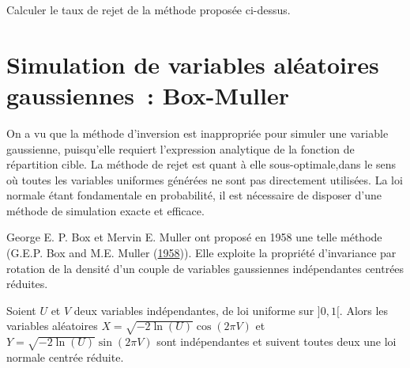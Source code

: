 \label{V-tauxrej}
Calculer le taux de rejet de la méthode proposée
ci-dessus.

\section{Simulation de variables aléatoires gaussiennes~:
Box-Muller}\label{V-simulation-de-variables-aluxe9atoires-gaussiennes-box-muller}

On a vu que la méthode d'inversion est inappropriée pour simuler une
variable gaussienne, puisqu'elle requiert l'expression analytique de la
fonction de répartition cible. La méthode de rejet est quant à elle sous-optimale,dans le sens où toutes les variables uniformes générées ne sont pas directement utilisées.
La loi normale étant fondamentale en probabilité, il est nécessaire de disposer d'une méthode de simulation exacte et
efficace.

George E. P. Box et Mervin E. Muller ont proposé en 1958 une telle
méthode (G.E.P. Box and M.E. Muller
(\protect\hyperlink{refV-BoxMuller}{1958})). Elle exploite la propriété
d'invariance par rotation de la densité d'un couple de variables
gaussiennes indépendantes centrées réduites.

\begin{proposition}\label{V-boxmuller}
Soient \(U\) et \(V\) deux variables indépendantes, de loi uniforme sur
\(]0,1[\). Alors les variables aléatoires
\(X = \sqrt{-2\ln(U)}\cos\left(2\pi V\right)\) et
\(Y = \sqrt{-2\ln(U)}\sin\left(2\pi V\right)\) sont indépendantes et
suivent toutes deux une loi normale centrée réduite.
\end{proposition}

